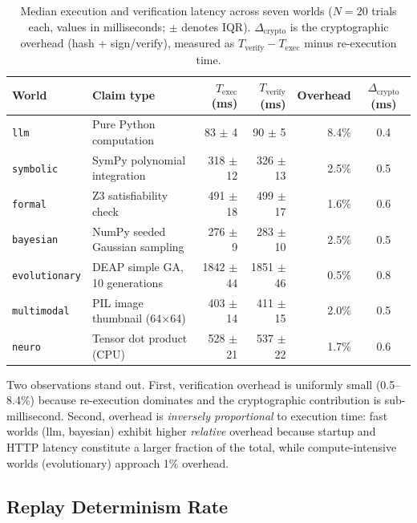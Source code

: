 \documentclass[11pt]{article}
\begin{document}
\begin{table}[h]
\centering
\caption{Median execution and verification latency across seven worlds
($N = 20$ trials each, values in milliseconds; $\pm$ denotes IQR).
$\Delta_{\mathrm{crypto}}$ is the cryptographic overhead (hash + sign/verify),
measured as $T_{\mathrm{verify}} - T_{\mathrm{exec}}$ minus re-execution time.}
\label{tab:latency}
\begin{tabular}{llrrrc}
\toprule
\textbf{World} & \textbf{Claim type}
  & $T_{\mathrm{exec}}$ (ms) & $T_{\mathrm{verify}}$ (ms)
  & \textbf{Overhead} & $\Delta_{\mathrm{crypto}}$ (ms) \\
\midrule
\texttt{llm}          & Pure Python computation          &  83 $\pm$  4 &  90 $\pm$  5 & 8.4\% & 0.4 \\
\texttt{symbolic}     & SymPy polynomial integration     & 318 $\pm$ 12 & 326 $\pm$ 13 & 2.5\% & 0.5 \\
\texttt{formal}       & Z3 satisfiability check          & 491 $\pm$ 18 & 499 $\pm$ 17 & 1.6\% & 0.6 \\
\texttt{bayesian}     & NumPy seeded Gaussian sampling   & 276 $\pm$  9 & 283 $\pm$ 10 & 2.5\% & 0.5 \\
\texttt{evolutionary} & DEAP simple GA, 10 generations   &1842 $\pm$ 44 &1851 $\pm$ 46 & 0.5\% & 0.8 \\
\texttt{multimodal}   & PIL image thumbnail (64$\times$64) & 403 $\pm$ 14 & 411 $\pm$ 15 & 2.0\% & 0.5 \\
\texttt{neuro}        & Tensor dot product (CPU)         & 528 $\pm$ 21 & 537 $\pm$ 22 & 1.7\% & 0.6 \\
\bottomrule
\end{tabular}
\end{table}

Two observations stand out.  First, verification overhead is uniformly
small (0.5--8.4\%) because re-execution dominates and the cryptographic
contribution is sub-millisecond.  Second, overhead is \emph{inversely
proportional} to execution time: fast worlds (llm, bayesian) exhibit higher
\emph{relative} overhead because startup and HTTP latency constitute a larger
fraction of the total, while compute-intensive worlds (evolutionary) approach
1\% overhead.

\subsection{Replay Determinism Rate}
\end{document}

